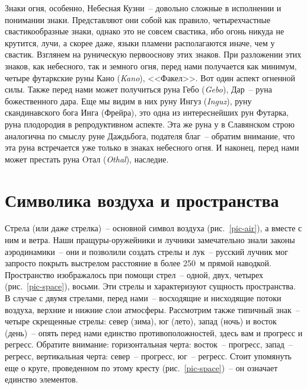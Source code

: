 \documentclass[pscyr,titlepage,chapters]{hedreport}
\begin{document}
  Знаки огня, особенно, Небесная Кузни~-- довольно сложные в исполнении и
  понимании знаки. Представляют они собой как правило, четырехчастные
  свастикообразные знаки, однако это не совсем свастика, ибо огонь никуда не
  крутится, лучи, а скорее даже, языки пламени располагаются иначе, чем у
  свастик. Взглянем на руническую первооснову этих знаков. При разложении этих
  знаков, как небесного, так и земного огня, перед нами получается как минимум,
  четыре футаркские руны Кано (\emph{Kano}), <<Факел>>. Вот один аспект огненной
  силы. Также перед нами может получиться
  руна Гебо (\emph{Gebo}), Дар~-- руна божественного дара. Еще мы видим в них
  руну Ингуз (\emph{Inguz}), руну скандинавского бога Инга (Фрейра), это одна из
  интереснейших рун Футарка, руна плодородия в репродуктивном аспекте. Эта же
  руна у в Славянском строю аналогична по смыслу руне Даждьбога, подателя
  благ~-- обратим внимание, что эта руна встречается уже только в знаках
  небесного огня. И наконец, перед нами может престать руна Oтал (\emph{Othal}),
  наследие.

  \chapter{Символика воздуха и пространства}

  Стрела (или даже стрелка)~-- основной символ
  воздуха (рис.~\ref{pic-air}), а вместе с ним и ветра. Наши пращуры-оружейники
  и лучники замечательно знали законы аэродинамики~-- они и позволили создать
  стрелы и  лук~-- русский лучник мог запросто покрыть выстрелом расстояние в 
  более 250~м прямой наводкой. Пространство изображалось при помощи стрел~--
  одной, двух, четырех (рис.~\ref{pic-space}), восьми. Эти стрелы и
  характеризуют сущность пространства. В случае с двумя стрелами, перед нами~--
  восходящие и нисходящие потоки воздуха, верхние и нижние слои атмосферы.
  Рассмотрим также типичный знак~-- четыре скрещенные стрелы: север (зима),
  юг (лето), запад (ночь) и восток (день)~-- опять перед нами единство
  противоположностей, здесь вам и прогресс и регресс. Обратите внимание:
  горизонтальная черта: восток~-- прогресс, запад~-- регресс, вертикальная
  черта: север~-- прогресс, юг~-- регресс. Стоит упомянуть еще о круге,
  проведенном по этому кресту (рис.~\ref{pic-space})~-- он означает единство
  элементов.
\end{document}
